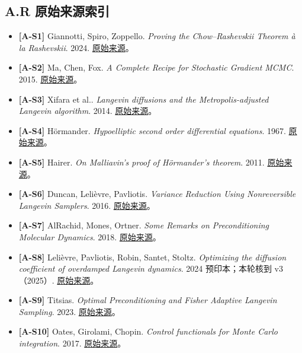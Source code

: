 \documentclass[
  11pt,
  a4paper,
]{article}
\providecommand{\tightlist}{%
  \setlength{\itemsep}{0pt}\setlength{\parskip}{0pt}}
\begin{document}
\hypertarget{a.r-ux539fux59cbux6765ux6e90ux7d22ux5f15}{%
\subsection{A.R
原始来源索引}\label{a.r-ux539fux59cbux6765ux6e90ux7d22ux5f15}}

\begin{itemize}
\tightlist
\item
  \textbf{{[}A-S1{]}} Giannotti, Spiro, Zoppello. \emph{Proving the
  Chow--Rashevskii Theorem à la Rashevskii}. 2024.
  \href{https://arxiv.org/html/2401.07546v2}{原始来源}。
\item
  \textbf{{[}A-S2{]}} Ma, Chen, Fox. \emph{A Complete Recipe for
  Stochastic Gradient MCMC}. 2015.
  \href{https://proceedings.neurips.cc/paper/2015/file/9a4400501febb2a95e79248486a5f6d3-Paper.pdf}{原始来源}。
\item
  \textbf{{[}A-S3{]}} Xifara et al.. \emph{Langevin diffusions and the
  Metropolis-adjusted Langevin algorithm}. 2014.
  \href{https://arxiv.org/pdf/1309.2983}{原始来源}。
\item
  \textbf{{[}A-S4{]}} Hörmander. \emph{Hypoelliptic second order
  differential equations}. 1967.
  \href{https://link.springer.com/article/10.1007/BF02392081}{原始来源}。
\item
  \textbf{{[}A-S5{]}} Hairer. \emph{On Malliavin's proof of Hörmander's
  theorem}. 2011.
  \href{https://hairer.org/papers/hormander.pdf}{原始来源}。
\item
  \textbf{{[}A-S6{]}} Duncan, Lelièvre, Pavliotis. \emph{Variance
  Reduction Using Nonreversible Langevin Samplers}. 2016.
  \href{https://pmc.ncbi.nlm.nih.gov/articles/PMC4939425/}{原始来源}。
\item
  \textbf{{[}A-S7{]}} AlRachid, Mones, Ortner. \emph{Some Remarks on
  Preconditioning Molecular Dynamics}. 2018.
  \href{https://www.numdam.org/item/SMAI-JCM_2018__4__57_0/}{原始来源}。
\item
  \textbf{{[}A-S8{]}} Lelièvre, Pavliotis, Robin, Santet, Stoltz.
  \emph{Optimizing the diffusion coefficient of overdamped Langevin
  dynamics}. 2024 预印本；本轮核到 v3（2025）.
  \href{https://arxiv.org/html/2404.12087v3}{原始来源}。
\item
  \textbf{{[}A-S9{]}} Titsias. \emph{Optimal Preconditioning and Fisher
  Adaptive Langevin Sampling}. 2023.
  \href{https://proceedings.neurips.cc/paper_files/paper/2023/hash/5da6d5818a156791090c875abeca3cf8-Abstract-Conference.html}{原始来源}。
\item
  \textbf{{[}A-S10{]}} Oates, Girolami, Chopin. \emph{Control
  functionals for Monte Carlo integration}. 2017.
  \href{https://arxiv.org/abs/1410.2392}{原始来源}。
\end{itemize}
\end{document}
